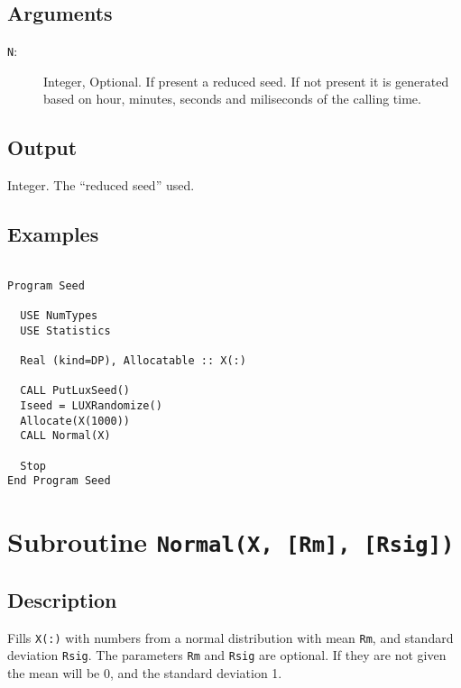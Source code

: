 \subsection{Arguments}

\begin{description}
\item[\texttt{N}:] Integer, Optional. If present a reduced seed. If
  not present it is generated based on hour, minutes, seconds and
  miliseconds of the calling time.
\end{description}

\subsection{Output}

Integer. The ``reduced seed'' used. 

\subsection{Examples}

\begin{lstlisting}[emph=LUXRandomize,
                   emphstyle=\color{blue},
                   frame=trBL,
                   caption=Randomizing the LUX generator., 
                   label=luxrandomize]

Program Seed

  USE NumTypes
  USE Statistics

  Real (kind=DP), Allocatable :: X(:)

  CALL PutLuxSeed()
  Iseed = LUXRandomize()
  Allocate(X(1000))
  CALL Normal(X)

  Stop
End Program Seed
\end{lstlisting}


\section{Subroutine \texttt{Normal(X, [Rm], [Rsig])}}

\subsection{Description}

Fills \texttt{X(:)} with numbers from a normal distribution with mean
\texttt{Rm}, and standard deviation \texttt{Rsig}. The parameters
\texttt{Rm} and \texttt{Rsig} are optional. If they are not given the
mean will be 0, and the standard deviation 1.

